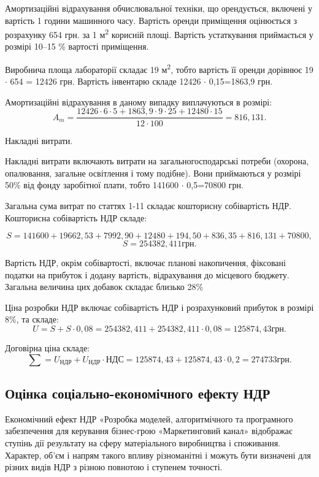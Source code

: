 Амортизаційні відрахування обчислювальної техніки, що орендується, включені у вартість 1 години машинного часу. Вартість оренди приміщення оцінюється з розрахунку 654 грн. за 1 м\textsuperscript{2} корисній площі. Вартість устаткування приймається у розмірі 10--15 \% вартості приміщення. 

Виробнича площа лабораторії складає 19 м\textsuperscript{2}, тобто вартість її оренди дорівнює 19 $\cdot$  654 = 12426 грн. Вартість інвентарю складе 12426 $\cdot$  0,15=1863,9 грн.

Амортизаційні відрахування в даному випадку виплачуються в розмірі:
\begin{equation}
A_m = \frac{12426  \cdot  6  \cdot  5+1863,9  \cdot  9  \cdot  25+12480  \cdot  15}{12  \cdot  100} = 816,131. \nonumber
\end{equation}

Накладні витрати.

Накладні витрати включають витрати на загальногосподарські потреби (охорона, опалювання, загальне освітлення і тому подібне). Вони приймаються у розмірі 50\% від фонду заробітної плати, тобто 141600 $\cdot$  0,5=70800 грн. 

Загальна сума витрат по статтях 1-11 складає кошторисну собівартість НДР. Кошторисна собівартість НДР складе:

\begin{equation}
S = 141600+19662,53+7992,90+12480+194,50+836,35+816,131 + 70800, \nonumber
\end{equation}
\begin{equation}
S = 254382,411 грн. \nonumber
\end{equation}

Вартість НДР, окрім собівартості, включає планові накопичення, фіксовані податки на прибуток і додану вартість, відрахування до місцевого бюджету. Загальна величина цих добавок складає близько 28\%

Ціна розробки НДР включає собівартість НДР і розрахунковий прибуток в розмірі 8\%, та складе:
\begin{equation}
U=S+S  \cdot  0,08 = 254382,411+254382,411  \cdot  0,08=125874,43 грн. \nonumber
\end{equation}

Договірна ціна складе: 
\begin{equation}
\sum = U_{\text{НДР}} + U_{\text{НДР}} \cdot {\text{НДС}} = 125874,43+125874,43  \cdot  0,2=274733 грн. \nonumber
\end{equation}

\subsection{Оцінка соціально-економічного ефекту НДР}
Економічний ефект НДР «Розробка моделей, алгоритмічного та програмного забезпечення для керування бізнес-грою «Маркетинговий канал» відображає ступінь дії результату на сферу матеріального виробництва і споживання. Характер, об'єм і напрям такого впливу різноманітні і можуть бути визначені для різних видів НДР з різною повнотою і ступенем точності.

